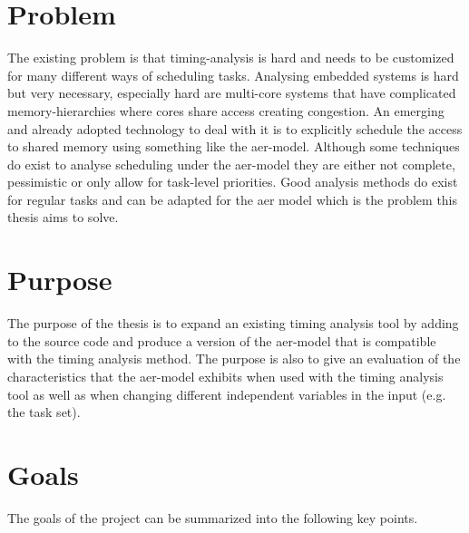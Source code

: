 \documentclass{kththesis}
\begin{document}
\section{Problem}

The existing problem is that timing-analysis is hard and needs to be customized for many
different ways of scheduling tasks. Analysing embedded systems is hard but very necessary,
especially hard are multi-core systems \parencite{davis_survey_2011} that have complicated
memory-hierarchies where cores share access creating congestion. An emerging and already adopted
technology to deal with it is to explicitly schedule the access to shared memory using something
like the \acrshort{aer}-model.  Although some techniques do exist to analyse scheduling under the
\acrshort{aer}-model they are either not complete, pessimistic or only allow for task-level
priorities. Good analysis methods do exist for regular tasks and can be adapted for the
\acrshort{aer} model which is the problem this thesis aims to solve.



\section{Purpose}

The purpose of the thesis is to expand an existing timing analysis tool by adding to the source
code and produce a version of the \acrshort{aer}-model that is compatible with the timing analysis
method. The purpose is also to give an evaluation of the characteristics that the \acrshort{aer}-model exhibits when used
with the timing analysis tool as well as when changing different independent variables in the
input (e.g. the task set).


\section{Goals}

The goals of the project can be summarized into the following key points.
\end{document}
